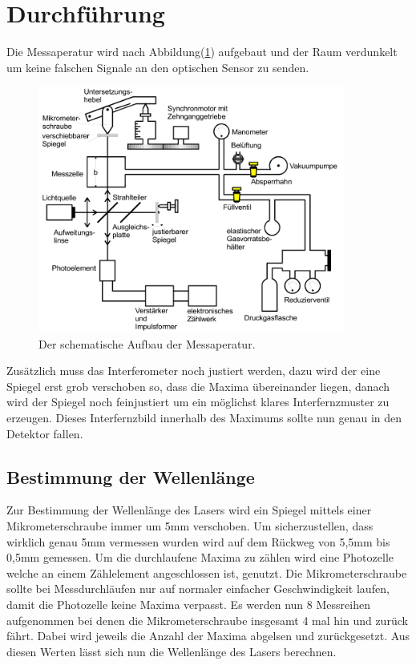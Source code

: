 \section{Durchführung}

    \noindent Die Messaperatur wird nach Abbildung(\ref{img:6}) aufgebaut und der Raum verdunkelt um keine falschen Signale an den optischen 
    Sensor zu senden.
    
    \begin{figure}[ht]
        \centering
        \includegraphics[width=0.9\textwidth]{latex/images/MessApp.PNG}
        \caption{Der schematische Aufbau der Messaperatur\protect \cite{V401}.}
        \label{img:6}
    \end{figure}

    \noindent Zusätzlich muss das Interferometer noch justiert werden, dazu wird der eine Spiegel erst grob verschoben so, dass die Maxima 
    übereinander liegen, danach wird der Spiegel noch feinjustiert um ein möglichst klares Interfernzmuster zu erzeugen. Dieses Interfernzbild 
    innerhalb des Maximums sollte nun genau in den Detektor fallen.

    \subsection{Bestimmung der Wellenlänge}

        \noindent Zur Bestimmung der Wellenlänge des Lasers wird ein Spiegel mittels einer Mikrometerschraube immer um 5mm verschoben. Um 
        sicherzustellen, dass wirklich genau 5mm vermessen wurden wird auf dem Rückweg von 5,5mm bis 0,5mm gemessen. Um die durchlaufene 
        Maxima zu zählen wird eine Photozelle welche an einem Zählelement angeschlossen ist, genutzt. Die Mikrometerschraube sollte bei 
        Messdurchläufen nur auf normaler einfacher Geschwindigkeit laufen, damit die Photozelle keine Maxima verpasst. Es werden nun 8 Messreihen 
        aufgenommen bei denen die Mikrometerschraube insgesamt 4 mal hin und zurück fährt. Dabei wird jeweils die Anzahl der Maxima abgelsen und 
        zurückgesetzt. Aus diesen Werten lässt sich nun die Wellenlänge des Lasers berechnen.

